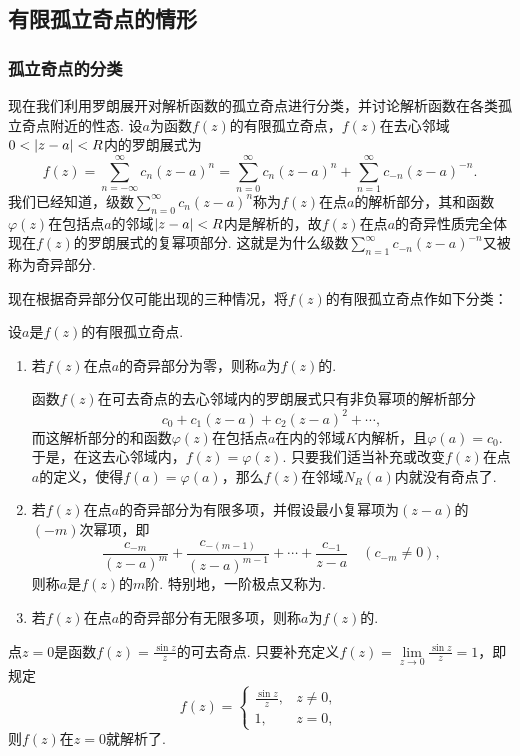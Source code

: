 \subsection{有限孤立奇点的情形}
\subsubsection{孤立奇点的分类}
现在我们利用罗朗展开对解析函数的孤立奇点进行分类，并讨论解析函数在各类孤立奇点附近的性态.
设\(a\)为函数\(f(z)\)的有限孤立奇点，\(f(z)\)在去心邻域\(0<\abs{z-a}<R\)内的罗朗展式为\[
f(z) = \sum\limits_{n=-\infty}^{\infty} c_n (z-a)^n
= \sum\limits_{n=0}^{\infty} c_n (z-a)^n
+ \sum\limits_{n=1}^{\infty} c_{-n} (z-a)^{-n}.
\]我们已经知道，级数\(\sum\limits_{n=0}^{\infty} c_n (z-a)^n\)称为\(f(z)\)在点\(a\)的解析部分，其和函数\(\varphi(z)\)在包括点\(a\)的邻域\(\abs{z-a}<R\)内是解析的，故\(f(z)\)在点\(a\)的奇异性质完全体现在\(f(z)\)的罗朗展式的复幂项部分.
这就是为什么级数\(\sum\limits_{n=1}^{\infty} c_{-n} (z-a)^{-n}\)又被称为奇异部分.

现在根据奇异部分仅可能出现的三种情况，将\(f(z)\)的有限孤立奇点作如下分类：
\begin{definition}
设\(a\)是\(f(z)\)的有限孤立奇点.
\begin{enumerate}
\item 若\(f(z)\)在点\(a\)的奇异部分为零，则称\(a\)为\(f(z)\)的.

{\footnotesize
函数\(f(z)\)在可去奇点的去心邻域内的罗朗展式只有非负幂项的解析部分\[
c_0 + c_1 (z-a) + c_2 (z-a)^2 + \dotsb,
\]而这解析部分的和函数\(\varphi(z)\)在包括点\(a\)在内的邻域\(K\)内解析，且\(\varphi(a) = c_0\).
于是，在这去心邻域内，\(f(z) = \varphi(z)\).
只要我们适当补充或改变\(f(z)\)在点\(a\)的定义，使得\(f(a) = \varphi(a)\)，那么\(f(z)\)在邻域\(N_R(a)\)内就没有奇点了.
}

\item 若\(f(z)\)在点\(a\)的奇异部分为有限多项，并假设最小复幂项为\((z-a)\)的\((-m)\)次幂项，即\[
\frac{c_{-m}}{(z-a)^m} + \frac{c_{-(m-1)}}{(z-a)^{m-1}} + \dotsb + \frac{c_{-1}}{z-a}
\quad(c_{-m}\neq0),
\]则称\(a\)是\(f(z)\)的\(m\)阶.
特别地，一阶极点又称为.

\item 若\(f(z)\)在点\(a\)的奇异部分有无限多项，则称\(a\)为\(f(z)\)的.
\end{enumerate}
\end{definition}

\begin{example}
点\(z=0\)是函数\(f(z) = \frac{\sin z}{z}\)的可去奇点.
只要补充定义\(f(z) = \lim\limits_{z\to0} \frac{\sin z}{z} = 1\)，即规定\[
f(z) = \left\{ \begin{array}{cc}
\frac{\sin z}{z}, & z\neq0, \\
1, & z=0,
\end{array} \right.
\]则\(f(z)\)在\(z=0\)就解析了.
\end{example}

